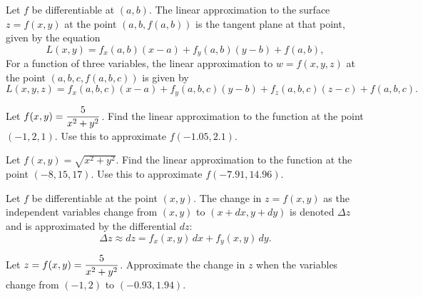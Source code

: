 \documentclass[mathNotesPreamble]{subfiles}
\begin{document}
  \begin{defn*}
    Let $f$ be differentiable at $(a,b)$. The linear approximation to the surface $z=f(x,y)$ at the point $(a,b,f(a,b))$ is the tangent plane at that point, given by the equation
      \[L(x,y)=f_x(a,b)(x-a)+f_y(a,b)(y-b)+f(a,b),\]
    For a function of three variables, the linear approximation to $w=f(x,y,z)$ at the point $(a,b,c,f(a,b,c))$ is given by
      \[L(x,y,z)=f_x(a,b,c)(x-a)+f_y(a,b,c)(y-b)+f_z(a,b,c)(z-c)+f(a,b,c).\]
  \end{defn*}
  \pagebreak

  \begin{ex*}
    Let $f(x,y)=\displaystyle\frac{5}{x^2+y^2}$. Find the linear approximation to the function at the point $(-1,2,1)$. Use this to approximate $f(-1.05, 2.1)$.
  \end{ex*}
  
  \begin{ex*}
    Let $f(x,y)=\sqrt{x^2+y^2}$. Find the linear approximation to the function at the point $(-8,15,17)$. Use this to approximate $f(-7.91, 14.96)$.
  \end{ex*}
  \pagebreak

  \begin{defn*}
    Let $f$ be differentiable at the point $(x,y)$. The change in $z=f(x,y)$ as the independent variables change from $(x,y)$ to $(x+dx, y+dy)$ is denoted $\Delta z$ and is approximated by the differential $dz$:
      \[\Delta z\approx dz= f_x(x,y)\,dx+f_y(x,y)\,dy.\]
  \end{defn*}

  \begin{ex*}
    Let $z=f(x,y)=\displaystyle\frac{5}{x^2+y^2}$. Approximate the change in $z$ when the variables change from $(-1,2)$ to $(-0.93, 1.94)$.
  \end{ex*}
  \pagebreak
\end{document}
